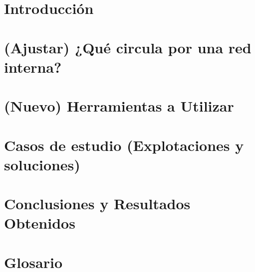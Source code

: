 \documentclass[12pt,twoside]{book}
\begin{document}
\nocite{*}

\frontmatter\pagestyle{empty}

\begin{titlepage}

\end{titlepage}

\begin{titlepage}

\end{titlepage}






\tableofcontents


\mainmatter\pagestyle{headings}


\chapter{Introducci\'on} 
    \label{capIntro}





\chapter{(Ajustar) ¿Qué circula por una red interna? } 
    \label{capImp}


\chapter{(Nuevo) Herramientas a Utilizar} 
    \label{capDesc}


\chapter{Casos de estudio (Explotaciones y soluciones)} 
    \label{capImp}







\chapter{Conclusiones y Resultados Obtenidos}
    \label{capConc}




\appendix
\chapter{Glosario}





%
\end{document}
